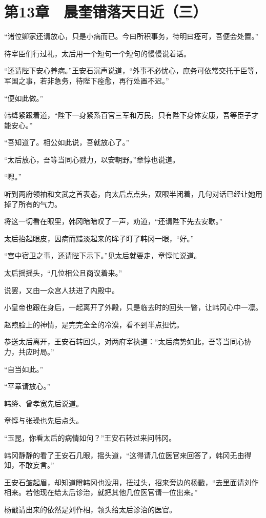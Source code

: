 \section{第13章　晨奎错落天日近（三）}

“诸位卿家还请放心，只是小病而已。今曰所积事务，待明曰痊可，吾便会处置。”

待宰臣们行过礼，太后用一个短句一个短句的慢慢说着话。

“还请陛下安心养病。”王安石沉声说道，“外事不必忧心，庶务可依常交托于臣等，军国之事，若非急务，待陛下痊愈，再行处置不迟。”

“便如此做。”

韩绛紧跟着道，“陛下一身紧系百官三军和万民，只有陛下身体安康，吾等臣子才能安心。”

“吾知道了。相公如此说，吾就放心了。”

“太后放心，吾等当同心戮力，以安朝野。”章惇也说道。

“嗯。”

听到两府领袖和文武之首表态，向太后点点头，双眼半闭着，几句对话已经让她用掉了所有的气力。

将这一切看在眼里，韩冈暗暗叹了一声，劝道，“还请陛下先去安歇。”

太后抬起眼皮，因病而黯淡起来的眸子盯了韩冈一眼，“好。”

“宫中宿卫之事，还请陛下示下。”见太后就要走，章惇忙说道。

太后摇摇头，“几位相公且商议着来。”

说罢，又由一众宫人扶进了内殿中。

小皇帝也跟在身后，一起离开了外殿，只是临去时的回头一瞥，让韩冈心中一凛。

赵煦脸上的神情，是完完全全的冷漠，看不到半点担忧。

恭送太后离开，王安石转回头，对两府宰执道：“太后病势如此，吾等当同心协力，共应时局。”

“自当如此。”

“平章请放心。”

韩绛、曾孝宽先后说道。

章惇与张璪也先后点头。

“玉昆，你看太后的病情如何？”王安石转过来问韩冈。

韩冈静静的看了王安石几眼，摇头道，“这得请几位医官来回答了，韩冈无由得知，不敢妄言。”

王安石皱起眉，却知道瞪韩冈也没用，扭过头，招来旁边的杨戬，“去里面请刘作相来。若他现在给太后诊治，就把其他几位医官请一位出来。”

杨戬请出来的依然是刘作相，领头给太后诊治的医官。

